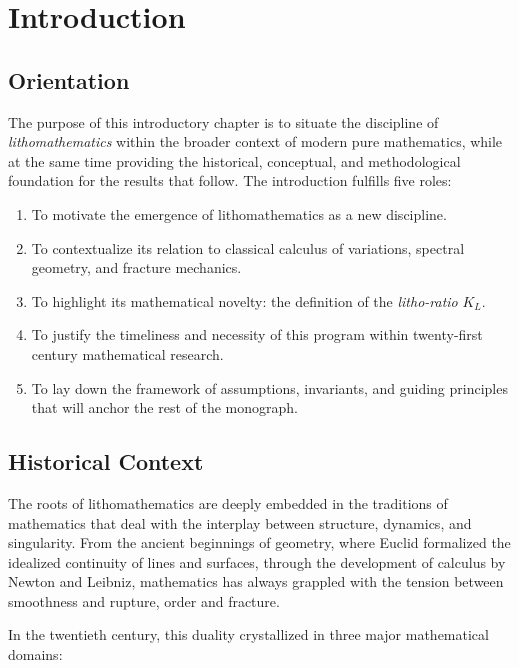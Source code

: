 \chapter{Introduction}
\label{ch:introduction}

\section*{Orientation}
The purpose of this introductory chapter is to situate the discipline of
\emph{lithomathematics} within the broader context of modern pure mathematics,
while at the same time providing the historical, conceptual, and methodological
foundation for the results that follow. The introduction fulfills five roles:

\begin{enumerate}[label=(\roman*)]
  \item To motivate the emergence of lithomathematics as a new discipline.
  \item To contextualize its relation to classical calculus of variations,
  spectral geometry, and fracture mechanics.
  \item To highlight its mathematical novelty: the definition of the
  \emph{litho-ratio} $K_L$.
  \item To justify the timeliness and necessity of this program within
  twenty-first century mathematical research.
  \item To lay down the framework of assumptions, invariants, and guiding
  principles that will anchor the rest of the monograph.
\end{enumerate}

\bigskip

\section*{Historical Context}
The roots of lithomathematics are deeply embedded in the traditions of
mathematics that deal with the interplay between structure, dynamics, and
singularity. From the ancient beginnings of geometry, where Euclid formalized
the idealized continuity of lines and surfaces, through the development of
calculus by Newton and Leibniz, mathematics has always grappled with the
tension between smoothness and rupture, order and fracture.

In the twentieth century, this duality crystallized in three major
mathematical domains:


